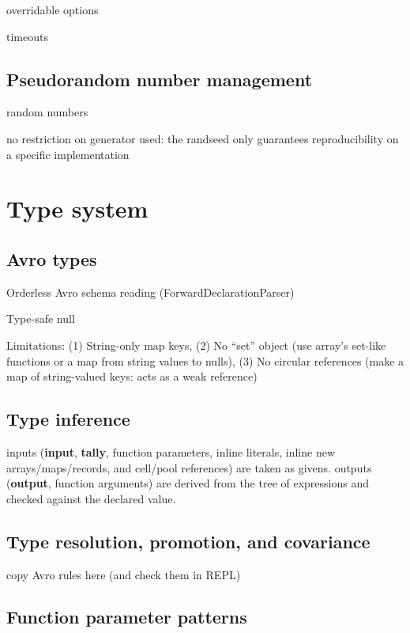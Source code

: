 \documentclass{article}
\newcommand{\PFAc}{\ttfamily\bfseries}
\theoremstyle{definition}
\begin{document}
overridable options

timeouts

\hypertarget{hsec:random}{}
\subsection{Pseudorandom number management}
\label{sec:random}

random numbers

no restriction on generator used: the randseed only guarantees reproducibility on a specific implementation

\pagebreak

\section{Type system}

\hypertarget{hsec:avro-types}{}
\subsection{Avro types}
\label{sec:avro-types}

Orderless Avro schema reading (ForwardDeclarationParser)

Type-safe null

Limitations: (1) String-only map keys, (2) No ``set'' object (use array's set-like functions or a map from string values to nulls), (3) No circular references (make a map of string-valued keys: acts as a weak reference)

\hypertarget{hsec:type-inference}{}
\subsection{Type inference}
\label{sec:type-inference}

inputs ({\PFAc input}, {\PFAc tally}, function parameters, inline literals, inline new arrays/maps/records, and cell/pool references) are taken as givens.  outputs ({\PFAc output}, function arguments) are derived from the tree of expressions and checked against the declared value.

\subsection{Type resolution, promotion, and covariance}

copy Avro rules here (and check them in REPL)

\subsection{Function parameter patterns}
\end{document}
